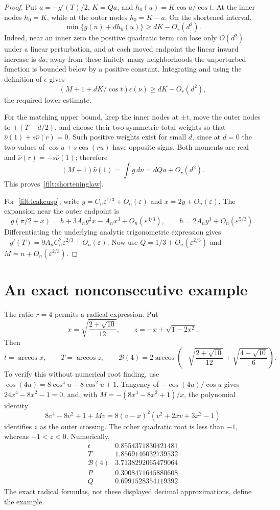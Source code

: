 \begin{proof}
Put $a=-g'(T)/2$, $K=Qa$, and
$h_0(u)=K\cos u/\cos t$.  At the inner nodes $h_0=K$, while at the
outer nodes $h_0=K-a$.  On the shortened interval,
\[
 \min\{g(u)+dh_0(u)\}\ge dK-O_r(d^2).
\]
Indeed, near an inner zero the positive quadratic term can lose only
$O(d^2)$ under a linear perturbation, and at each moved endpoint the
linear inward increase is $da$; away from these finitely many neighborhoods
the unperturbed function is bounded below by a positive constant.
Integrating and using the definition of $\epsilon$ gives
\[
 (M+1+dK/\cos t)\epsilon(\nu)\ge dK-O_r(d^2),
\]
the required lower estimate.

For the matching upper bound, keep the inner nodes at $\pm t$, move the
outer nodes to $\pm(T-d/2)$, and choose their two symmetric total weights
so that
$\widehat\nu(1)+s\widehat\nu(r)=0$.
Such positive weights exist for small $d$, since at $d=0$ the two values
of $\cos u+s\cos(ru)$ have opposite signs.  Both moments are real and
$\widehat\nu(r)=-s\widehat\nu(1)$; therefore
\[
 (M+1)\widehat\nu(1)=\int g\,d\nu
                  =dQa+O_r(d^2).
\]
This proves~\eqref{filt:shorteninglaw}.

For~\eqref{filt:leakcusp}, write $y=C_n\varepsilon^{1/3}+O_n(\varepsilon)$
and $x=2y+O_n(\varepsilon)$.  The expansion near the outer endpoint is
\[
 g(\pi/2+x)=h+3A_ny^2x-A_nx^3+O_n(\varepsilon^{4/3}),
 \qquad h=2A_ny^3+O_n(\varepsilon^{5/3}).
\]
Differentiating the underlying analytic trigonometric expression gives
$-g'(T)=9A_nC_n^2\varepsilon^{2/3}+O_n(\varepsilon)$.
Now use $Q=1/3+O_n(\varepsilon^{2/3})$ and $M=n+O_n(\varepsilon^{2/3})$.
\end{proof}

\section{An exact nonconsecutive example}

The ratio $r=4$ permits a radical expression.  Put
\[
 x=\sqrt{\frac{2+\sqrt{10}}{12}},\qquad
 z=-x+\sqrt{1-2x^2}.
\]
Then
\[
 t=\arccos x,\qquad T=\arccos z,\qquad
 \boxed{\mathcal B(4)=2\arccos\left(
 -\sqrt{\frac{2+\sqrt{10}}{12}}
 +\sqrt{\frac{4-\sqrt{10}}6}\right)}.
\]
To verify this without numerical root finding, use
$\cos(4u)=8\cos^4u-8\cos^2u+1$.  Tangency of
$-\cos(4u)/\cos u$ gives $24x^4-8x^2-1=0$, and, with
$M=-(8x^4-8x^2+1)/x$, the polynomial identity
\[
 8v^4-8v^2+1+Mv
   =8(v-x)^2(v^2+2xv+3x^2-1)
\]
identifies $z$ as the outer crossing.  The other quadratic root is less
than $-1$, whereas $-1<z<0$.  Numerically,
\[
 \begin{array}{c|r}
 t&0.8554371830421481\\
 T&1.8569146032739532\\
 \mathcal B(4)&3.7138292065479064\\
 P&0.3008471645880608\\
 Q&0.6991528354119392
 \end{array}
\]
The exact radical formulas, not these displayed decimal approximations,
define the example.

